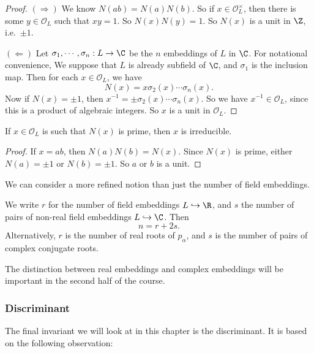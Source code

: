 \documentclass[a4paper]{article}
\begin{document}
\begin{proof}
  $(\Rightarrow)$ We know $N(a b) = N(a)N(b)$. So if $x \in \mathcal{O}_L^\times$, then there is some $y \in \mathcal{O}_L$ such that $xy = 1$. So $N(x) N(y) = 1$. So $N(x)$ is a unit in $\Z$, i.e.\ $\pm 1$.

  $(\Leftarrow)$ Let $\sigma_1, \cdots, \sigma_n: L \to \C$ be the $n$ embeddings of $L$ in $\C$. For notational convenience, We suppose that $L$ is already subfield of $\C$, and $\sigma_1$ is the inclusion map. Then for each $x \in \mathcal{O}_L$, we have
  \[
    N(x) = x \sigma_2(x) \cdots \sigma_n(x).
  \]
  Now if $N(x) = \pm 1$, then $x^{-1} = \pm \sigma_2(x) \cdots \sigma_n(x)$. So we have $x^{-1} \in \mathcal{O}_L$, since this is a product of algebraic integers. So $x$ is a unit in $\mathcal{O}_L$.
\end{proof}

\begin{cor}
  If $x \in \mathcal{O}_L$ is such that $N(x)$ is prime, then $x$ is irreducible.
\end{cor}

\begin{proof}
  If $x = ab$, then $N(a)N(b) = N(x)$. Since $N(x)$ is prime, either $N(a) = \pm 1$ or $N(b) = \pm 1$. So $a$ or $b$ is a unit.
\end{proof}
We can consider a more refined notion than just the number of field embeddings.

\begin{defi}[$r$ and $s$]
  We write $r$ for the number of field embeddings $L \hookrightarrow \R$, and $s$ the number of pairs of non-real field embeddings $L \hookrightarrow \C$. Then
  \[
    n = r + 2s.
  \]
  Alternatively, $r$ is the number of real roots of $p_\alpha$, and $s$ is the number of pairs of complex conjugate roots.
\end{defi}
The distinction between real embeddings and complex embeddings will be important in the second half of the course.

\subsubsection*{Discriminant}
The final invariant we will look at in this chapter is the discriminant. It is based on the following observation:
\end{document}
